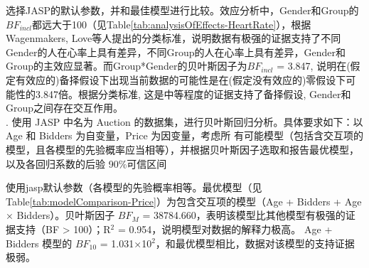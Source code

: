 \documentclass[stu,12pt,floatsintext]{apa7} %
\begin{document}
\vspace{1em}
\indent 选择JASP的默认参数，并和最佳模型进行比较。效应分析中，Gender和Group的\(BF_{incl}\)都远大于100（见Table\ref{tab:analysisOfEffects-HeartRate}），根据Wagenmakers, Love等人提出的分类标准，说明数据有极强的证据支持了不同Gender的人在心率上具有差异，不同Group的人在心率上具有差异，Gender和Group的主效应显著。而Group*Gender的贝叶斯因子为\(BF_{incl}\) = 3.847, 说明在(假定有效应的)备择假设下出现当前数据的可能性是在(假定没有效应的)零假设下可能性的3.847倍。根据分类标准, 这是中等程度的证据支持了备择假设, Gender和Group之间存在交互作用。\\

\vspace{1em}
. {\heiti  使用 JASP 中名为 Auction 的数据集，进行贝叶斯回归分析。具体要求如下：以 Age 和 Bidders 为自变量，Price 为因变量，考虑所
有可能模型（包括含交互项的模型，且各模型的先验概率应当相等），并根据贝叶斯因子选取和报告最优模型，以及各回归系数的后验 90\%可信区间}


\vspace{1em}
使用jasp默认参数（各模型的先验概率相等。最优模型（见Table\ref{tab:modelComparison-Price}）为包含交互项的模型（Age + Bidders + Age × Bidders）。贝叶斯因子 \(BF_M\) = 38784.660，表明该模型比其他模型有极强的证据支持（BF > 100）；R\(^2\) = 0.954，说明模型对数据的解释力极高。
Age + Bidders 模型的 \(BF_{10}\) = 1.031×10\(^2\)，和最优模型相比，数据对该模型的支持证据极弱。\\

\begin{table}[H]
	\centering
	\caption{模型比较}
	\label{tab:modelComparison-Price}
\end{table}
\end{document}
